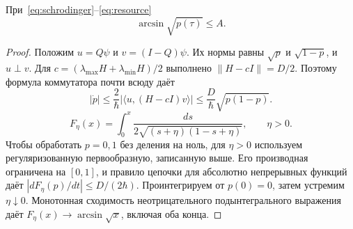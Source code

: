 \section{}\label{sec:action}
\begin{theorem}\label{thm:action}
{При~\eqref{eq:schrodinger}--\eqref{eq:resource}}
\begin{equation}\label{eq:actionbound}
 \arcsin\sqrt{p(\tau)}\leq A.
\end{equation}
\end{theorem}
\begin{proof}
{Положим $u=Q\psi$ и $v=(I-Q)\psi$. Их нормы равны $\sqrt p$ и $\sqrt{1-p}$, и $u\perp v$. Для $c=(\lambda_{\max}H+\lambda_{\min}H)/2$ выполнено $\|H-cI\|=D/2$. Поэтому формула коммутатора почти всюду даёт}
\begin{equation}\label{eq:derivative}
 |\dot p|\leq\frac{2}{\hbar}|\langle u,(H-cI)v\rangle|
 \leq\frac{D}{\hbar}\sqrt{p(1-p)}.
\end{equation}
\[ F_\eta(x)=\int_0^x\frac{ds}{2\sqrt{(s+\eta)(1-s+\eta)}},\qquad\eta>0. \]
{Чтобы обработать $p=0,1$ без деления на ноль, для $\eta>0$ используем регуляризованную первообразную, записанную выше. Его производная ограничена на $[0,1]$, и правило цепочки для абсолютно непрерывных функций даёт $|dF_\eta(p)/dt|\leq D/(2\hbar)$. Проинтегрируем от $p(0)=0$, затем устремим $\eta\downarrow0$. Монотонная сходимость неотрицательного подынтегрального выражения даёт $F_\eta(x)\to\arcsin\sqrt x$, включая оба конца.}
\end{proof}

